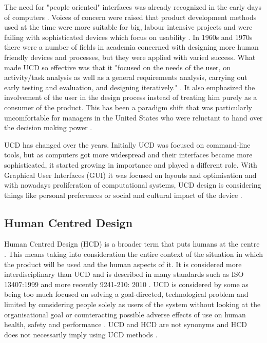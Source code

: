 The need for "people oriented" interfaces was already recognized in the early days of computers \citep{ritter2014foundations, nickerson1969man}. Voices of concern were raised that product development methods used at the time were more suitable for big, labour intensive projects and were failing with sophisticated devices which focus on usability \citep{greenbaum1993design, robert1965new}. In 1960s and 1970s there were a number of fields in academia concerned with designing more human friendly devices and processes, but they were applied with varied success. What made UCD so effective was that it "focused on the needs of the user, on activity/task analysis as well as a general requirements analysis, carrying out early testing and evaluation, and designing iteratively." \citep{ritter2014foundations}. It also emphasized the involvement of the user in the design process instead of treating him purely as a consumer of the product. This has been a paradigm shift that was particularly uncomfortable for managers in the United States who were reluctant to hand over the decision making power \citep{greenbaum1993design}.

UCD has changed over the years.  Initially UCD was focused on command-line tools, but as computers got more widespread and their interfaces became more sophisticated, it started growing in importance and played a different role. With Graphical User Interfaces (GUI) it was focused on layouts and optimisation and with nowadays proliferation of computational systems, UCD design is considering things like personal preferences or social and cultural impact of the device \citep{ritter2014foundations}.

		\subsection{Human Centred Design}

Human Centred Design (HCD) is a broader term that puts humans at the centre \citep{ritter2014foundations, Earthy2001, iso199913407, 1_kurosu_2011}. This means taking into consideration the entire context of the situation in which the product will be used and the human aspects of it. It is considered more interdisciplinary than UCD and is described in many standards \citep{Bevan2001} such as ISO 13407:1999 \citep{iso199913407} and more recently 9241-210: 2010 \citep{dis20099241}. UCD is considered by some as being too much focused on solving a goal-directed, technological problem and limited by considering people solely as users of the system without looking at the organisational goal or counteracting possible adverse effects of use on human health, safety and performance \citep{gasson2003human, gill1996foundations, Bevan2001}. UCD and HCD are not synonyms and HCD does not necessarily imply using UCD methods \citep{Earthy2001, Maguire2001, 1_kurosu_2011, ritter2014foundations}. 
		
